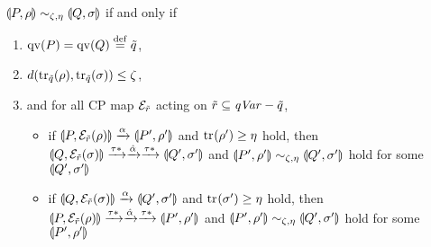 \begin{lem}
\label{prob_bisim:parcoinduction}
 $\llparenthesis P, \rho \rrparenthesis \sim_{\zeta,\eta} \llparenthesis Q, \sigma \rrparenthesis$ if and
 only if 
\begin{enumerate}
 \item $\mathrm{qv}(P)=\mathrm{qv}(Q) \overset{\mathrm{def}}{=} \tilde q$,
 \item $d({\rm tr}_{\tilde q}(\rho), {\rm tr}_{\tilde q}(\sigma))  \le \zeta$,
 \item and for all CP map $\mathcal{E}_{\tilde r}$ acting on 
       $\tilde r \subseteq \mathit{qVar} - \tilde q$,
       \begin{itemize}
	\item
	     if $\llparenthesis P, \mathcal{E}_{\tilde r}(\rho) \rrparenthesis \xrightarrow{\alpha}
	     \llparenthesis P', \rho' \rrparenthesis$ and ${\rm tr}_{}(\rho') \ge \eta$ hold,
	     then
	     $\llparenthesis Q, \mathcal{E}_{\tilde r}(\sigma) \rrparenthesis 
	     \xrightarrow{\tau*}
	     \xrightarrow{\hat \alpha}
	     \xrightarrow{\tau*} \llparenthesis Q', \sigma' \rrparenthesis$ and
	     $\llparenthesis P', \rho' \rrparenthesis \sim_{\zeta, \eta}
	     \llparenthesis Q', \sigma' \rrparenthesis$ hold
	     for some  $\llparenthesis Q', \sigma' \rrparenthesis$
	\item
	     if $\llparenthesis Q, \mathcal{E}_{\tilde r}(\sigma) \rrparenthesis \xrightarrow{\alpha}
	     \llparenthesis Q', \sigma' \rrparenthesis$ and ${\rm tr}_{}(\sigma') \ge \eta$ hold,
	     then
	     $\llparenthesis P, \mathcal{E}_{\tilde r}(\rho) \rrparenthesis \xrightarrow{\tau*}
	     \xrightarrow{\hat \alpha}
	     \xrightarrow{\tau*} \llparenthesis P', \rho' \rrparenthesis$ and
	     $\llparenthesis P', \rho' \rrparenthesis \sim_{\zeta, \eta} \llparenthesis Q', \sigma' \rrparenthesis$
	     hold for some
	     $\llparenthesis P', \rho' \rrparenthesis$
       \end{itemize}
\end{enumerate}
\end{lem}
